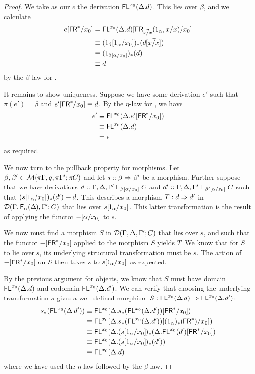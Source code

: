 \begin{proof}
We take as our $e$ the derivation $\mathsf{FL}^{x_0}(\Delta.d)$. This lies over $\beta$, and we calculate
\begin{align*}
e[\mathsf{FR}^*/x_0] &= \mathsf{FL}^{x_0}(\Delta.d)[\mathsf{FR}_{\vec{x/x}}(1_\alpha,{x}/x)/x_0] \\
&\equiv (1_\beta[1_\alpha/x_0])_*(d[\vec{{x}/x}])\\
&\equiv (1_{\beta[\alpha/x_0]})_*(d)\\
&\equiv d
\end{align*}
by the $\beta$-law for . 

It remains to show uniqueness. Suppose we have some derivation $e'$ such that $\pi(e') = \beta$ and $e'[\mathsf{FR}^*/x_0] \equiv d$. By the $\eta$-law for , we have
\begin{align*}
e' &\equiv \mathsf{FL}^{x_0}(\Delta.e'[\mathsf{FR}^*/x_0])\\
&\equiv \mathsf{FL}^{x_0}(\Delta.d)\\
&= e
\end{align*}
as required.

We now turn to the pullback property for morphisms. Let $\beta, \beta' \in \mathcal{M}(\pi\Gamma, q, \pi\Gamma'; \pi C)$ and let $s :: \beta \Rightarrow \beta'$ be a morphism. Further suppose that we have derivations $d :: \Gamma, \Delta, \Gamma' \vdash_{\beta[\alpha/x_0]} C$ and $d' :: \Gamma, \Delta, \Gamma' \vdash_{\beta'[\alpha/x_0]} C$ such that $(s[1_\alpha/x_0])_*(d') \equiv d$. This describes a morphism $T : d \Rightarrow d'$ in $\mathcal{D}(\Gamma,\mathsf{F}_{\alpha}(\Delta),\Gamma';C)$ that lies over $s[1_\alpha/x_0]$. This latter transformation is the result of applying the functor $-[\alpha/x_0]$ to $s$.

We now must find a morphism $S$ in $\mathcal{D}(\Gamma,\Delta,\Gamma';C)$ that lies over $s$, and such that the functor $-[\mathsf{FR}^*/x_0]$ applied to the morphism $S$ yields $T$. We know that for $S$ to lie over $s$, its underlying structural transformation must be $s$. The action of $-[\mathsf{FR}^*/x_0]$ on $S$ then takes $s$ to $s[1_\alpha/x_0]$ as expected.

By the previous argument for objects, we know that $S$ must have domain $\mathsf{FL}^{x_0}(\Delta.d)$ and codomain $\mathsf{FL}^{x_0}(\Delta.d')$. We can verify that choosing the underlying transformation $s$ gives a well-defined morphism $S : \mathsf{FL}^{x_0}(\Delta.d) \Rightarrow \mathsf{FL}^{x_0}(\Delta.d')$:
\begin{align*}
s_*( \mathsf{FL}^{x_0}(\Delta.d')) &\equiv \mathsf{FL}^{x_0}(\Delta.s_*( \mathsf{FL}^{x_0}(\Delta.d'))[\mathsf{FR}^*/x_0])\\
&\equiv \mathsf{FL}^{x_0}(\Delta.s_*( \mathsf{FL}^{x_0}(\Delta.d'))[(1_\alpha)_*(\mathsf{FR}^*)/x_0])\\
&\equiv \mathsf{FL}^{x_0}(\Delta.(s[1_\alpha/x_0])_*( \Delta.\mathsf{FL}^{x_0}(d')[\mathsf{FR}^*/x_0])\\
&\equiv \mathsf{FL}^{x_0}(\Delta.(s[1_\alpha/x_0])_*(d') )\\
&\equiv \mathsf{FL}^{x_0}(\Delta.d)
\end{align*}
where we have used the $\eta$-law followed by the $\beta$-law. 


\end{proof}
